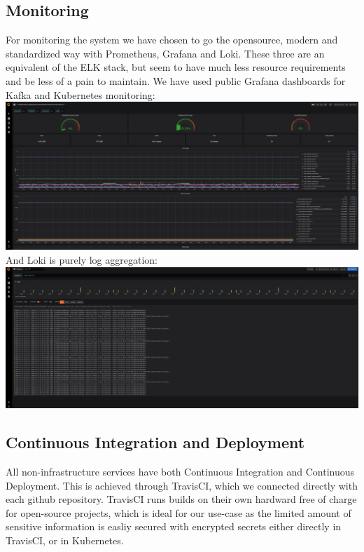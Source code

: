 \subsection{Monitoring}
For monitoring the system we have chosen to go the opensource, modern and standardized way with Prometheus, Grafana and Loki.
These three are an equivalent of the ELK stack, but seem to have much less resource requirements and be less of a pain to maintain.
We have used public Grafana dashboards for Kafka and Kubernetes monitoring:\\
\includegraphics[scale=0.133]{grafana.png}\\
And Loki is purely log aggregation:\\
\includegraphics[scale=0.133]{loki.png}\\


\subsection{Continuous Integration and Deployment}
All non-infrastructure services have both Continuous Integration and Continuous Deployment. 
This is achieved through TravisCI, which we connected directly with each github repository. 
TravisCI runs builds on their own hardward free of charge for open-source projects, which is ideal for our use-case as the limited amount of sensitive information is easliy secured with encrypted secrets either directly in TravisCI, or in Kubernetes.

